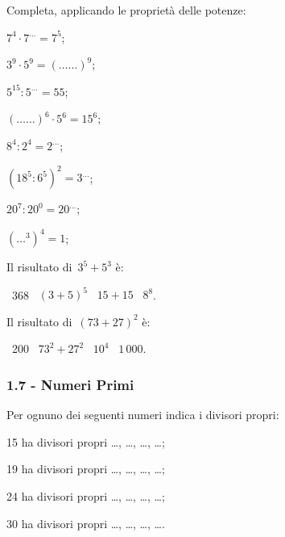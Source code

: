 \begin{esercizio}
\label{ese:1.12}
 Completa, applicando le proprietà delle potenze:
\begin{multicols}{3}
 \begin{enumeratea}
 \item $7^4\cdot7^{\ldots}=7^5$;
 \item $3^9\cdot5^9=(\ldots\ldots)^9$;
 \item $5^{15}:5^{\ldots}=55$;
 \item $(\ldots\ldots)^6\cdot5^6=15^6$;
 \item $8^4:2^4=2^{\ldots}$;
 \item $(18^5:6^5)^2=3^{\ldots}$;
 \item $20^7:20^0=20^{\ldots}$;
 \item $(\ldots^3)^4=1$;
 \end{enumeratea}
\end{multicols}
\end{esercizio}

\begin{esercizio}
\label{ese:1.13}
 Il risultato di~$3^5+5^3$ è:
 \begin{center}
 \boxA\:~368 \quad\boxB\:~$(3+5)^5$ \quad\boxC\:~$15+15$ \quad\boxD\:~$8^8$.
 \end{center}
\end{esercizio}

\begin{esercizio}
\label{ese:1.14}
 Il risultato di~$(73+27)^2$ è:
 \begin{center}
 \boxA\:~200 \quad\boxB\:~$73^2+27^2$ \quad\boxC\:~$10^4$ \quad\boxD\:~$1\,000$.
 \end{center}
\end{esercizio}

\subsubsection*{1.7 - Numeri Primi}
\begin{esercizio}
\label{ese:1.15}
 Per ognuno dei seguenti numeri indica i divisori propri:
 \begin{enumeratea}
 \item 15 ha divisori propri \ldots, \ldots, \ldots, \ldots;
 \item 19 ha divisori propri \ldots, \ldots, \ldots, \ldots;
 \item 24 ha divisori propri \ldots, \ldots, \ldots, \ldots;
 \item 30 ha divisori propri \ldots, \ldots, \ldots, \ldots.
 \end{enumeratea}
\end{esercizio}

